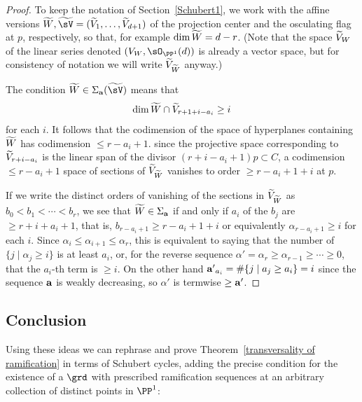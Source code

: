 \begin{proof}
To keep the notation of Section~\ref{Schubert1}, we work with the affine versions
$\tL, \tsV = (\tV_1, \dots, \tV_{d+1})$ of the projection center and the osculating flag at $p$, respectively,
so that, for example $\dim \tL = d-r$. (Note that the space $\tV_W$ of the linear series 
denoted $(V_W, \sO_{\PP^1}(d))$ 
is already a vector space, but for consistency of notation we will write $\tV_\tL$ anyway.)

The condition $\tL \in \Sigma_{\bf a}({\tsV})$
 means that 
$$
\dim \tL \cap \tV_{r+1+i-a_i} \geq i
$$
for each $i$. 
It follows that the codimension of the space of hyperplanes containing $\tL$ has codimension $\leq r-a_i+1$.
since the projective space corresponding to $\tV_{r+i-a_i}$ is the linear span of the divisor $(r+i-a_i+1)p\subset C$,
a codimension $\leq r-a_i+1$ space of sections of $\tV_\tL$  vanishes to order $\geq r -a_i+1+i$ at $p$. 

If we write the distinct orders of vanishing of the sections in $\tV_\tL$ as
$b_0 < b_1<  \cdots < b_r$, we see that $\tL \in \Sigma_{\bf a}$  if and only if
$a_i$ of the $b_j$ are $\geq r+i+a_i+1$, that is,
$b_{r-a_i+1}\geq r-a_i+1+i$ or equivalently $\alpha_{r-a_i+1}\geq i$ for each $i$.
Since $\alpha_i\leq \alpha_{i+1} \leq \alpha_r$,
this is equivalent to saying that the number of $\{j \mid \alpha_j \geq i\}$ is at least $a_i$, or, for the
reverse sequence $\alpha' = \alpha_r \geq \alpha_{r-1} \geq \cdots \geq 0$, that the $a_i$-th term is $\geq i$.
On the other hand ${\bf a'}_{a_i} = \#\{j\mid a_j \geq a_i\} = i$ since the sequence ${\bf a}$ is weakly
decreasing, so $\alpha'$ is termwise $\geq {\bf a'}$.
\end{proof}

\subsection{Conclusion}

Using these ideas we  can rephrase and prove Theorem~\ref{transversality of ramification} in terms of Schubert cycles,
adding the precise condition for the existence of a $\grd$ with prescribed ramification sequences
at an arbitrary collection of distinct points in $\PP^{1}$:

